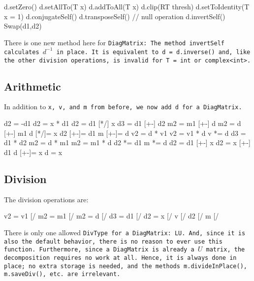 \begin{tmvcode}
d.setZero()
d.setAllTo(T x)
d.addToAll(T x)
d.clip(RT thresh)
d.setToIdentity(T x = 1)
d.conjugateSelf()
d.transposeSelf() // null operation
d.invertSelf()
Swap(d1,d2)
\end{tmvcode}
There is one new method here for \tt{DiagMatrix}: The method \tt{invertSelf}  calculates $d^{-1}$ in place.  
It is equivalent to \tt{d = d.inverse()} and, like the other division operations, is invalid for \tt{T = int} or \tt{complex<int>}.
\vspace{12pt}

\subsection{Arithmetic}
\label{DiagMatrix_Arithmetic}

In addition to \tt{x}, \tt{v}, and \tt{m} from before, we now add \tt{d} for a \tt{DiagMatrix}.

\begin{tmvcode}
d2 = -d1
d2 = x * d1
d2 = d1 [*/] x
d3 = d1 [+-] d2
m2 = m1 [+-] d
m2 = d [+-] m1
d [*/]= x
d2 [+-]= d1
m [+-]= d
v2 = d * v1
v2 = v1 * d
v *= d
d3 = d1 * d2
m2 = d * m1
m2 = m1 * d
d2 *= d1
m *= d
d2 = d1 [+-] x
d2 = x [+-] d1
d [+-]= x
d = x
\end{tmvcode}

\subsection{Division}
\label{DiagMatrix_Division}

The division operations are:
\begin{tmvcode}
v2 = v1 [/%
m2 = m1 [/%
m2 = d [/%
d3 = d1 [/%
d2 = x [/%
v [/%
d2 [/%
m [/%
\end{tmvcode}

There is only one allowed \tt{DivType} for a \tt{DiagMatrix}: \tt{LU}. 
And, since it is also the default behavior,
there is no reason to ever use this function.  Furthermore, since a \tt{DiagMatrix}
is already a $U$ matrix, the decomposition requires no work at all.
Hence, it is always done in place; no extra storage is needed, and 
the methods \tt{m.divideInPlace()}, \tt{m.saveDiv()}, etc. are irrelevant.

